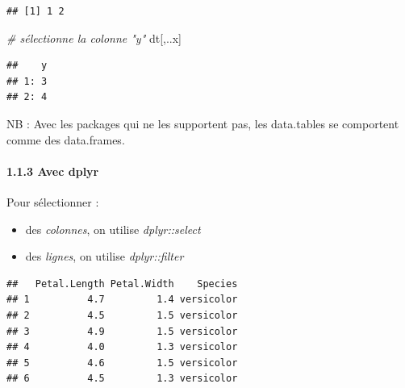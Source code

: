 \documentclass[
]{article}
\newenvironment{Shaded}{\begin{snugshade}}{\end{snugshade}}
\newcommand{\CommentTok}[1]{\textcolor[rgb]{0.56,0.35,0.01}{\textit{#1}}}
\newcommand{\DecValTok}[1]{\textcolor[rgb]{0.00,0.00,0.81}{#1}}
\newcommand{\KeywordTok}[1]{\textcolor[rgb]{0.13,0.29,0.53}{\textbf{#1}}}
\newcommand{\NormalTok}[1]{#1}
\newcommand{\OperatorTok}[1]{\textcolor[rgb]{0.81,0.36,0.00}{\textbf{#1}}}
\newcommand{\StringTok}[1]{\textcolor[rgb]{0.31,0.60,0.02}{#1}}
\providecommand{\tightlist}{%
  \setlength{\itemsep}{0pt}\setlength{\parskip}{0pt}}
\begin{document}
\begin{verbatim}
## [1] 1 2
\end{verbatim}

\begin{Shaded}
\begin{Highlighting}[]
\CommentTok{# sélectionne la colonne "y"}
\NormalTok{dt[,..x]}
\end{Highlighting}
\end{Shaded}

\begin{verbatim}
##    y
## 1: 3
## 2: 4
\end{verbatim}

NB : Avec les packages qui ne les supportent pas, les data.tables se
comportent comme des data.frames.

\hypertarget{avec-dplyr}{%
\paragraph{1.1.3 Avec dplyr}\label{avec-dplyr}}

Pour sélectionner :

\begin{itemize}
\tightlist
\item
  des \emph{colonnes}, on utilise \emph{dplyr::select}
\item
  des \emph{lignes}, on utilise \emph{dplyr::filter}
\end{itemize}

\begin{Shaded}
\end{Shaded}

\begin{verbatim}
##   Petal.Length Petal.Width    Species
## 1          4.7         1.4 versicolor
## 2          4.5         1.5 versicolor
## 3          4.9         1.5 versicolor
## 4          4.0         1.3 versicolor
## 5          4.6         1.5 versicolor
## 6          4.5         1.3 versicolor
\end{verbatim}
\end{document}
